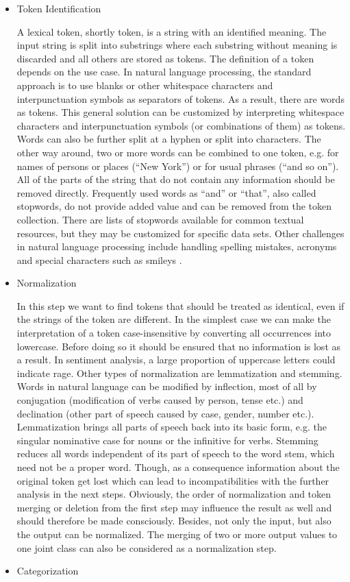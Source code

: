 \documentclass[article,type=msc,colorback,accentcolor=tud7b]{tudthesis}
\begin{document}
    \begin{itemize}
      \item Token Identification
      
        A lexical token, shortly token, is a string with an identified meaning. The input string is split into substrings where each substring without meaning is discarded and all others are stored as tokens. The definition of a token depends on the use case. In natural language processing, the standard approach is to use blanks or other whitespace characters and interpunctuation symbols as separators of tokens. As a result, there are words as tokens. This general solution can be customized by interpreting whitespace characters and interpunctuation symbols (or combinations of them) as tokens. Words can also be further split at a hyphen or split into characters. The other way around, two or more words can be combined to one token, e.g. for names of persons or places (“New York”) or for usual phrases (“and so on”). All of the parts of the string that do not contain any information should be removed directly. Frequently used words as “and” or “that”, also called stopwords, do not provide added value and can be removed from the token collection. There are lists of stopwords available for common textual resources, but they may be customized for specific data sets. Other challenges in natural language processing include handling spelling mistakes, acronyms and special characters such as smileys \autocite{Kharde2016}.
      \item Normalization
      
        In this step we want to find tokens that should be treated as identical, even if the strings of the token are different. In the simplest case we can make the interpretation of a token case-insensitive by converting all occurrences into lowercase. Before doing so it should be ensured that no information is lost as a result. In sentiment analysis, a large proportion of uppercase letters could indicate rage. Other types of normalization are lemmatization and stemming. Words in natural language can be modified by inflection, most of all by conjugation (modification of verbs caused by person, tense etc.) and declination (other part of speech caused by case, gender, number etc.). Lemmatization brings all parts of speech back into its basic form, e.g. the singular nominative case for nouns or the infinitive for verbs. Stemming reduces all words independent of its part of speech to the word stem, which need not be a proper word. Though, as a consequence information about the original token get lost which can lead to incompatibilities with the further analysis in the next steps. Obviously, the order of normalization and token merging or deletion from the first step may influence the result as well and should therefore be made consciously. Besides, not only the input, but also the output can be normalized. The merging of two or more output values to one joint class can also be considered as a normalization step.
      \item Categorization
      

\end{itemize}
\end{document}
